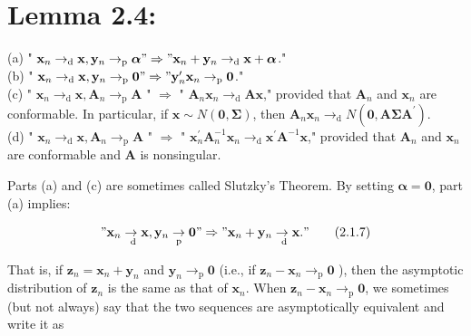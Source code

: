\documentclass[10pt]{article}
\begin{document}
\section*{Lemma 2.4:}
(a) " $\mathbf{x}_{n} \rightarrow_{\mathrm{d}} \mathbf{x}, \mathbf{y}_{n} \rightarrow_{\mathrm{p}} \boldsymbol{\alpha} " \Rightarrow " \mathbf{x}_{n}+\mathbf{y}_{n} \rightarrow_{\mathrm{d}} \mathbf{x}+\boldsymbol{\alpha}$."\\
(b) " $\mathbf{x}_{n} \rightarrow_{\mathrm{d}} \mathbf{x}, \mathbf{y}_{n} \rightarrow_{\mathrm{p}} \mathbf{0} " \Rightarrow " \mathbf{y}_{n}^{\prime} \mathbf{x}_{n} \rightarrow_{\mathrm{p}} \mathbf{0}$."\\
(c) " $\mathbf{x}_{n} \rightarrow_{\mathrm{d}} \mathbf{x}, \mathbf{A}_{n} \rightarrow_{\mathrm{p}} \mathbf{A}$ " $\Rightarrow$ " $\mathbf{A}_{n} \mathbf{x}_{n} \rightarrow_{\mathrm{d}} \mathbf{A x}$," provided that $\mathbf{A}_{n}$ and $\mathbf{x}_{n}$ are conformable. In particular, if $\mathbf{x} \sim N(\mathbf{0}, \mathbf{\Sigma})$, then $\mathbf{A}_{n} \mathbf{x}_{n} \rightarrow_{\mathrm{d}} N\left(\mathbf{0}, \mathbf{A} \boldsymbol{\Sigma} \mathbf{A}^{\prime}\right)$.\\
(d) " $\mathbf{x}_{n} \rightarrow_{\mathrm{d}} \mathbf{x}, \mathbf{A}_{n} \rightarrow_{\mathrm{p}} \mathbf{A}$ " $\Rightarrow$ " $\mathbf{x}_{n}^{\prime} \mathbf{A}_{n}^{-1} \mathbf{x}_{n} \rightarrow_{\mathrm{d}} \mathbf{x}^{\prime} \mathbf{A}^{-1} \mathbf{x}$," provided that $\mathbf{A}_{n}$ and $\mathbf{x}_{n}$ are conformable and $\mathbf{A}$ is nonsingular.

Parts (a) and (c) are sometimes called Slutzky's Theorem. By setting $\boldsymbol{\alpha}=\mathbf{0}$, part (a) implies:


\begin{equation*}
" \mathbf{x}_{n} \underset{\mathrm{~d}}{\rightarrow} \mathbf{x}, \mathbf{y}_{n} \underset{\mathrm{p}}{\rightarrow} \mathbf{0} " \Rightarrow " \mathbf{x}_{n}+\mathbf{y}_{n} \underset{\mathrm{~d}}{\rightarrow} \mathbf{x} . " \tag{2.1.7}
\end{equation*}


That is, if $\mathbf{z}_{n}=\mathbf{x}_{n}+\mathbf{y}_{n}$ and $\mathbf{y}_{n} \rightarrow_{\mathrm{p}} \mathbf{0}$ (i.e., if $\mathbf{z}_{n}-\mathbf{x}_{n} \rightarrow_{\mathrm{p}} \mathbf{0}$ ), then the asymptotic distribution of $\mathbf{z}_{n}$ is the same as that of $\mathbf{x}_{n}$. When $\mathbf{z}_{n}-\mathbf{x}_{n} \rightarrow_{\mathrm{p}} \mathbf{0}$, we sometimes (but not always) say that the two sequences are asymptotically equivalent and write it as
\end{document}
